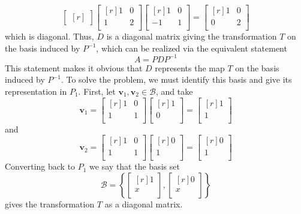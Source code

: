 \documentclass{article}
\theoremstyle{definition}
\newenvironment{solution}[1][]{\begin{replacementsoln}}{\end{replacementsoln}}
\begin{document}
\begin{solution}
\[\begin{bmatrix}[r]
    \end{bmatrix}\begin{bmatrix}[r]
      1&0   \\
      1& 2  \\
   \end{bmatrix}\begin{bmatrix}[r]
      1 & 0  \\
      -1 & 1  \\
    \end{bmatrix}= \begin{bmatrix}[r]
      1 &0   \\
       0&  2 \\
    \end{bmatrix}
  \]
  which is diagonal. Thus, \(D \) is a diagonal matrix giving the transformation \(T\) on the basis induced by \(P ^{-1} \), which can be realized via the equivalent statement
  \[
    A = PDP ^{-1} 
  \]
  This statement makes it obvious that \(D\) represents the map \(T\) on the basis induced by \(P ^{-1} \). To solve the problem, we must identify this basis and give its representation in \(P_1\). First, let \(\mathbf{v}_1,\mathbf{v}_2\in \mathcal{B}\), and take
  \[
    \mathbf{v}_1 =\begin{bmatrix}[r]
      1 &0   \\
       1&1   \\
    \end{bmatrix} \begin{bmatrix}[r]
       1 \\
       0 \\
    \end{bmatrix} = \begin{bmatrix}[r]
       1 \\
       1 \\
    \end{bmatrix}
  \]
  and
  \[
    \mathbf{v}_2 =\begin{bmatrix}[r]
      1 & 0  \\
       1&1   \\
    \end{bmatrix} \begin{bmatrix}[r]
       0 \\
       1 \\
    \end{bmatrix} = \begin{bmatrix}[r]
       0 \\
       1 \\
    \end{bmatrix}
  \]
  Converting back to \(P_1\) we say that the basis set
  \[
    \mathcal{B}=\left\{ \begin{bmatrix}[r]
       1 \\
       x \\
    \end{bmatrix}, \begin{bmatrix}[r]
       0 \\
       x \\
    \end{bmatrix} \right\} 
  \]
  gives the transformation \(T\) as a diagonal matrix.
\end{solution}
\end{document}
